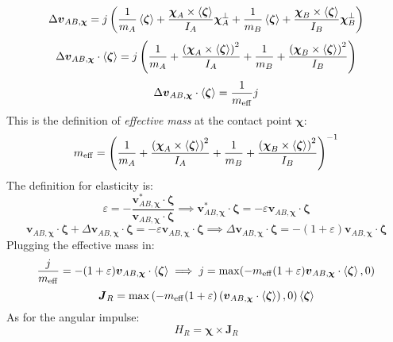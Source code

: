 \documentclass[10pt]{report}
\DeclareMathOperator{\eff}{eff}
\begin{document}
\begin{equation}\Delta\boldsymbol{v}_{AB,\boldsymbol{\chi}}=j\left(\frac{1}{m_A}\braket{\boldsymbol{\zeta}}+\frac{\boldsymbol{\chi}_A\times\braket{\boldsymbol{\zeta}}}{I_A}\boldsymbol{\chi}_A^\perp+\frac{1}{m_B}\braket{\boldsymbol{\zeta}}+\frac{\boldsymbol{\chi}_B\times\braket{\boldsymbol{\zeta}}}{I_B}\boldsymbol{\chi}_B^\perp\right)\end{equation}
\begin{equation}\Delta\boldsymbol{v}_{AB,\boldsymbol{\chi}}\cdot\braket{\boldsymbol{\zeta}}=j\left(\frac{1}{m_A}+\frac{\left(\boldsymbol{\chi}_A\times\braket{\boldsymbol{\zeta}}\right)^2}{I_A}+\frac{1}{m_B}+\frac{\left(\boldsymbol{\chi}_B\times\braket{\boldsymbol{\zeta}}\right)^2}{I_B}\right)\end{equation}
\begin{equation}\Delta\boldsymbol{v}_{AB,\boldsymbol{\chi}}\cdot\braket{\boldsymbol{\zeta}}=\frac{1}{m_{\eff}}j\end{equation}
This is the definition of \textit{effective mass} at the contact point $\boldsymbol{\chi}$:
\begin{equation}m_{\eff}=\left(\frac{1}{m_A}+\frac{\left(\boldsymbol{\chi}_A\times\braket{\boldsymbol{\zeta}}\right)^2}{I_A}+\frac{1}{m_B}+\frac{\left(\boldsymbol{\chi}_B\times\braket{\boldsymbol{\zeta}}\right)^2}{I_B}\right)^{-1}\end{equation}
The definition for elasticity is:
\begin{equation}\varepsilon=-\frac{\boldsymbol{v}^*_{AB,\boldsymbol{\chi}}\cdot\boldsymbol{\zeta}}{\boldsymbol{v}_{AB,\boldsymbol{\chi}}\cdot\boldsymbol{\zeta}}\implies\boldsymbol{v}^*_{AB,\boldsymbol{\chi}}\cdot\boldsymbol{\zeta}=-\varepsilon\boldsymbol{v}_{AB,\boldsymbol{\chi}}\cdot\boldsymbol{\zeta}\end{equation}
\begin{equation}\boldsymbol{v}_{AB,\boldsymbol{\chi}}\cdot\boldsymbol{\zeta}+\Delta\boldsymbol{v}_{AB,\boldsymbol{\chi}}\cdot\boldsymbol{\zeta}=-\varepsilon\boldsymbol{v}_{AB,\boldsymbol{\chi}}\cdot\boldsymbol{\zeta}\implies\Delta\boldsymbol{v}_{AB,\boldsymbol{\chi}}\cdot\boldsymbol{\zeta}=-(1+\varepsilon)\boldsymbol{v}_{AB,\boldsymbol{\chi}}\cdot\boldsymbol{\zeta}\end{equation}
Plugging the effective mass in:
\begin{equation}\frac{j}{m_{\eff}}=-(1+\varepsilon)\boldsymbol{v}_{AB,\boldsymbol{\chi}}\cdot\braket{\boldsymbol{\zeta}}\implies j=\max(-m_{\eff}(1+\varepsilon)\boldsymbol{v}_{AB,\boldsymbol{\chi}}\cdot\braket{\boldsymbol{\zeta}}, 0)\end{equation}
\begin{equation}\boldsymbol{J}_R=\max\left(-m_{\eff}(1+\varepsilon)\left(\boldsymbol{v}_{AB,\boldsymbol{\chi}}\cdot\braket{\boldsymbol{\zeta}}\right), 0\right)\braket{\boldsymbol{\zeta}}\end{equation}
As for the angular impulse:
\begin{equation}H_R=\boldsymbol{\chi}\times\boldsymbol{J}_R\end{equation}
\end{document}
